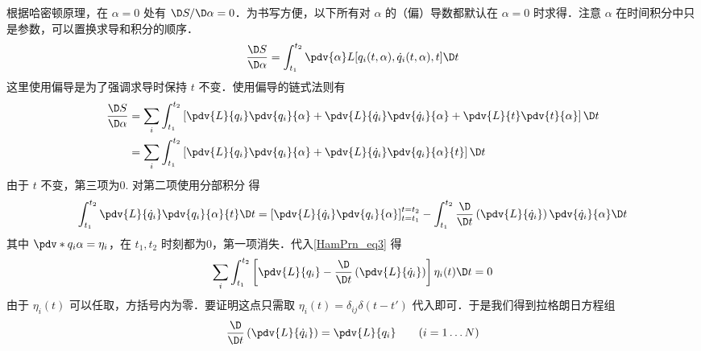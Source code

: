 根据哈密顿原理，在 $\alpha = 0$ 处有 $\D S/\D\alpha  = 0$．为书写方便，以下所有对 $\alpha$ 的（偏）导数都默认在 $\alpha=0$ 时求得．注意 $\alpha$ 在时间积分中只是参数，可以置换求导和积分的顺序．
\begin{equation}
\frac{\D S}{\D\alpha } = \int_{t_1}^{t_2} {\pdv{\alpha} L[{q_i}(t,\alpha ),{{\dot q}_i}(t,\alpha ),t]\D t}
\end{equation}
这里使用偏导是为了强调求导时保持 $t$ 不变．使用偏导的链式法则有
\begin{equation}\label{HamPrn_eq3}
\begin{aligned}
\frac{\D S}{\D\alpha } &= \sum\limits_i {\int_{t_1}^{t_2} {\left[ {\pdv{L}{q_i} \pdv{q_i}{\alpha} + \pdv{L}{\dot q_i} \pdv{\dot q_i}{\alpha} + \pdv{L}{t} \pdv{t}{\alpha}} \right]\D t} } \\
&= \sum\limits_i {\int_{t_1}^{t_2} {\left[ {\pdv{L}{q_i} \pdv{q_i}{\alpha} + \pdv{L}{\dot q_i}\pdv{q_i}{\alpha}{t}} \right]\D t} } 
\end{aligned}\end{equation}
由于 $t$ 不变，第三项为0. 对第二项使用分部积分 得
\begin{equation}
\int_{t_1}^{t_2} {\pdv{L}{\dot q_i} \pdv{q_i}{\alpha}{t} \D t}  = \left[ {\pdv{L}{\dot q_i}\pdv{q_i}{\alpha}} \right]_{t = {t_1}}^{t = {t_2}} - \int_{t_1}^{t_2} {\frac{\D}{\D t}\left( {\pdv{L}{\dot q_i}} \right)\pdv{\dot q_i}{\alpha} \D t} 
\end{equation}
其中 $\pdv*{q_i}{\alpha}  = {\eta_i}$，在 $t_1,t_2$ 时刻都为0，第一项消失．代入\autoref{HamPrn_eq3} 得
\begin{equation}
\sum\limits_i {\int_{t_1}^{t_2} {\left[ {\pdv{L}{q_i} - \frac{\D}{\D t}\left( {\pdv{L}{\dot q_i}} \right)} \right]{\eta_i}(t)\D t} }  = 0
\end{equation}
由于 ${\eta_i}(t)$ 可以任取，方括号内为零．要证明这点只需取 ${\eta_i}(t) = {\delta_{ij}}\delta (t - t')$ 代入即可．于是我们得到拉格朗日方程组
\begin{equation}
\frac{\D}{\D t}\left( {\pdv{L}{\dot q_i}} \right) = \pdv{L}{q_i}
\qquad
(i = 1\dots N)
\end{equation}